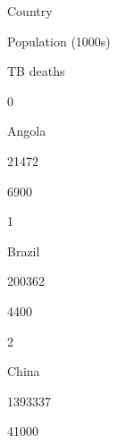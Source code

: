 \documentclass[letterpaper,10pt,english]{sphinxmanual}
\begin{document}

















Country





Population (1000s)





TB deaths









0





Angola





21472





6900









1





Brazil





200362





4400









2





China





1393337





41000
\end{document}
